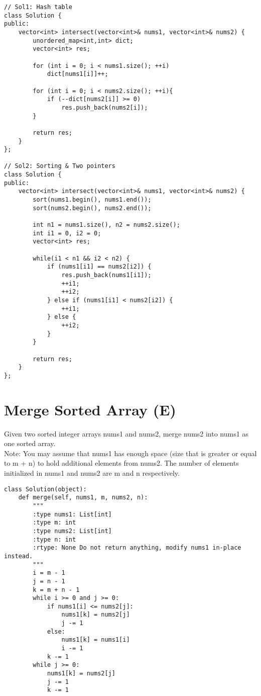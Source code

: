 \begin{lstlisting}
// Sol1: Hash table
class Solution {
public:
    vector<int> intersect(vector<int>& nums1, vector<int>& nums2) {
        unordered_map<int,int> dict;
        vector<int> res;
        
        for (int i = 0; i < nums1.size(); ++i)
            dict[nums1[i]]++;
            
        for (int i = 0; i < nums2.size(); ++i){
            if (--dict[nums2[i]] >= 0)
                res.push_back(nums2[i]);
        }
        
        return res;
    }
};

// Sol2: Sorting & Two pointers
class Solution {
public:
    vector<int> intersect(vector<int>& nums1, vector<int>& nums2) {
        sort(nums1.begin(), nums1.end());
        sort(nums2.begin(), nums2.end());
        
        int n1 = nums1.size(), n2 = nums2.size();
        int i1 = 0, i2 = 0;
        vector<int> res;
        
        while(i1 < n1 && i2 < n2) {
            if (nums1[i1] == nums2[i2]) {
                res.push_back(nums1[i1]);
                ++i1;
                ++i2;
            } else if (nums1[i1] < nums2[i2]) {
                ++i1;
            } else {
                ++i2;
            }
        }
        
        return res;
    }
};
\end{lstlisting}  


\section{Merge Sorted Array (E)}
Given two sorted integer arrays nums1 and nums2, merge nums2 into nums1 as one sorted array.\\

Note: You may assume that nums1 has enough space (size that is greater or equal to m + n) to hold additional elements from nums2. The number of elements initialized in nums1 and nums2 are m and n respectively.\\

\begin{lstlisting}
class Solution(object):
    def merge(self, nums1, m, nums2, n):
        """
        :type nums1: List[int]
        :type m: int
        :type nums2: List[int]
        :type n: int
        :rtype: None Do not return anything, modify nums1 in-place instead.
        """
        i = m - 1
        j = n - 1
        k = m + n - 1
        while i >= 0 and j >= 0:
            if nums1[i] <= nums2[j]:
                nums1[k] = nums2[j]
                j -= 1
            else:
                nums1[k] = nums1[i]
                i -= 1
            k -= 1
        while j >= 0:
            nums1[k] = nums2[j]
            j -= 1
            k -= 1
\end{lstlisting}

